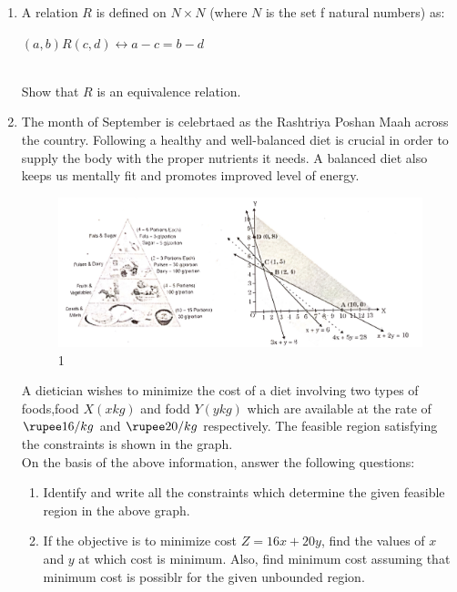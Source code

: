 \begin{enumerate}
	\item A relation $R$ is defined on $N \times N$ (where $N$ is the set f natural numbers) as:\\
		\centerline{$(a,b)R(c,d) \leftrightarrow a - c = b - d$}\\
	Show that $R$ is an equivalence relation.
        \item The month of September is celebrtaed as the Rashtriya Poshan Maah across the country. Following a healthy and well-balanced diet is crucial in order to supply the body with the proper nutrients it needs. A balanced diet also keeps us mentally fit and promotes improved level of energy.\\
		\begin{figure}[h]
			\centering 
			      \includegraphics[width=120mm]{figs/Graphs.jpg}
			      \caption{1}
			\label{figure}
		\end{figure}
		A dietician wishes to minimize the cost of a diet involving two types of foods,food $X (x kg)$ and fodd $Y (y kg)$ which are available at the rate of $\rupee 16/kg$ and $\rupee 20/kg$ respectively. The feasible region satisfying the constraints is shown in the graph.\\
		On the basis of the above information, answer the following questions:
		\begin{enumerate}[label=(\roman*)]
			\item Identify and write all the constraints which determine the given feasible region in the above graph.
			\item If the objective is to minimize cost $Z = 16x +20y$, find the values of $x$ and $y$ at which cost is minimum. Also, find minimum cost assuming that minimum cost is possiblr for the given unbounded region.
		\end{enumerate}
\end{enumerate}
